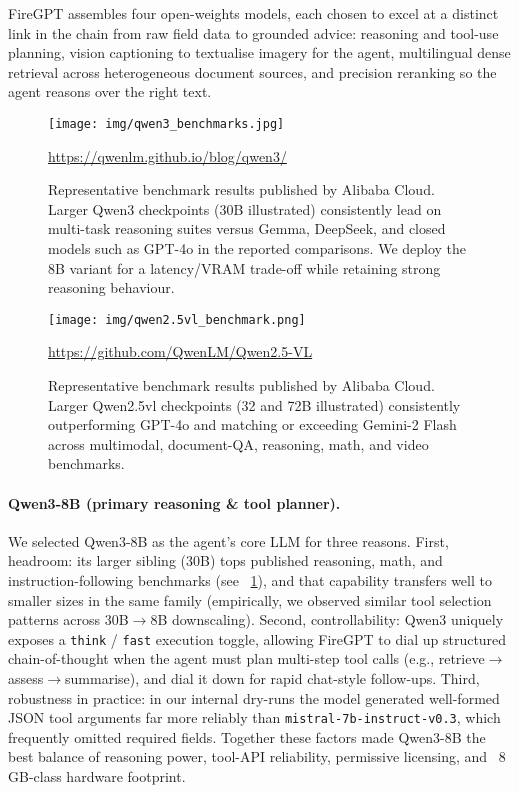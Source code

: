 \documentclass[lang=english,inputenc=utf8,fontsize=10pt]{ldvarticle}
\begin{document}
FireGPT assembles four open-weights models, each chosen to excel at a
distinct link in the chain from raw field data to grounded advice:
reasoning and tool-use planning,
vision captioning to textualise imagery for the agent,
multilingual dense retrieval across heterogeneous document sources, and
precision reranking so the agent reasons over the right text.

\begin{figure}[t]
  \centering
  \texttt{[image: img/qwen3\_benchmarks.jpg]}
  \caption{Representative benchmark results published by Alibaba Cloud.
           Larger Qwen3 checkpoints (30B illustrated) consistently lead
           on multi-task reasoning suites versus Gemma, DeepSeek, and
           closed models such as GPT-4o in the reported comparisons.
           We deploy the 8B variant for a latency/VRAM trade-off while
           retaining strong reasoning behaviour.}
  \url{https://qwenlm.github.io/blog/qwen3/}
  \label{fig:qwen3-benchmarks}
\end{figure}


\begin{figure}[t]
  \centering
  \texttt{[image: img/qwen2.5vl\_benchmark.png]}
  \caption{Representative benchmark results published by Alibaba Cloud.
           Larger Qwen2.5vl checkpoints (32 and 72B illustrated) consistently
           outperforming GPT-4o and matching or exceeding Gemini-2 Flash across multimodal, 
           document-QA, reasoning, math, and video benchmarks.}
  \label{fig:qwen2.5vl-benchmarks}
  \url{https://github.com/QwenLM/Qwen2.5-VL}
\end{figure}

\paragraph{Qwen3-8B (primary reasoning \& tool planner).}
We selected Qwen3-8B as the agent’s core LLM for three reasons.
First, headroom: its larger sibling (30B) tops published
reasoning, math, and instruction-following benchmarks (see
~\cref{fig:qwen3-benchmarks}), and that capability transfers well to
smaller sizes in the same family (empirically, we observed similar tool
selection patterns across 30B$\rightarrow$8B downscaling).
Second, controllability: Qwen3 uniquely exposes a
\texttt{think} / \texttt{fast} execution toggle, allowing FireGPT to dial
up structured chain-of-thought when the agent must plan multi-step tool
calls (e.g., retrieve$\rightarrow$assess$\rightarrow$summarise), and dial
it down for rapid chat-style follow-ups.
Third, robustness in practice: in our internal dry-runs the model
generated well-formed JSON tool arguments far more reliably than
\texttt{mistral-7b-instruct-v0.3}, which frequently omitted required
fields. Together these factors made Qwen3-8B the best balance of reasoning
power, tool-API reliability, permissive licensing, and ~8\,GB-class
hardware footprint.
\end{document}
